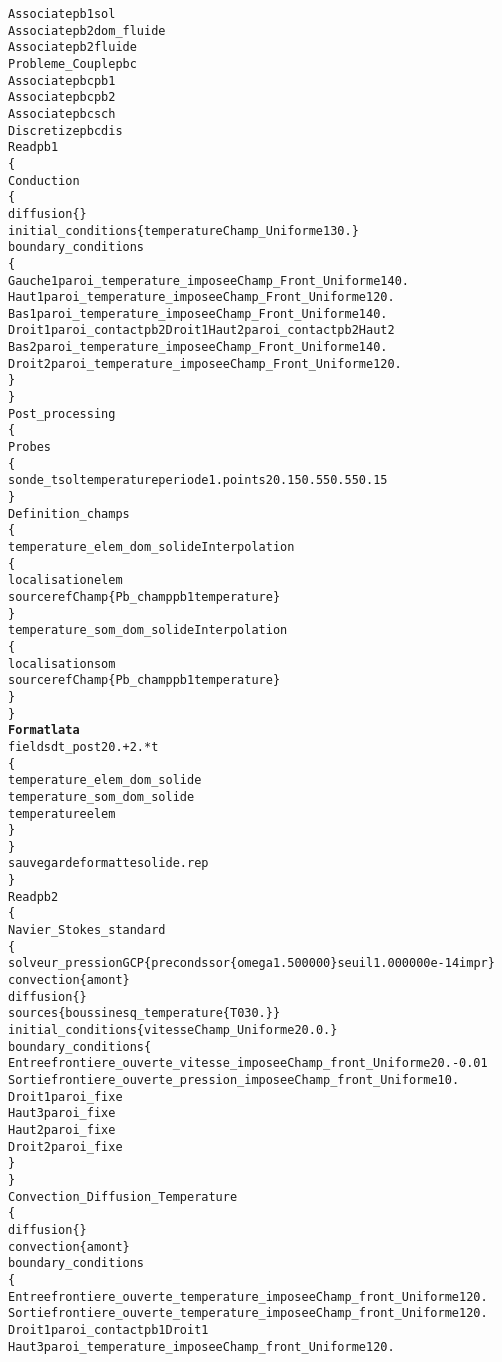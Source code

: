 \begin{alltt}
Associate pb1 sol
Associate pb2 dom_fluide
Associate pb2 fluide
Probleme_Couple pbc
Associate pbc pb1
Associate pbc pb2
Associate pbc sch
Discretize pbc dis
Read pb1
\{
    Conduction
    \{
        diffusion \{ \}
        initial_conditions \{ temperature Champ_Uniforme 1 30. \}
        boundary_conditions
        \{
            Gauche1 paroi_temperature_imposee   Champ_Front_Uniforme 1 40.
            Haut1   paroi_temperature_imposee   Champ_Front_Uniforme 1 20.
            Bas1    paroi_temperature_imposee   Champ_Front_Uniforme 1 40.
            Droit1  paroi_contact pb2  Droit1   Haut2   paroi_contact pb2  Haut2
            Bas2    paroi_temperature_imposee   Champ_Front_Uniforme 1 40.
            Droit2  paroi_temperature_imposee   Champ_Front_Uniforme 1 20.
        \}
    \}
    Post_processing
    \{
        Probes
        \{
            sonde_tsol temperature periode 1. points 2     0.15 0.55     0.55 0.15 
        \}
        Definition_champs 
        \{
            temperature_elem_dom_solide Interpolation
            \{
                localisation elem
                source refChamp \{ Pb_champ pb1 temperature \}
            \}
            temperature_som_dom_solide Interpolation 
            \{
                localisation som
                source refChamp \{ Pb_champ pb1 temperature \}
            \}
        \}
        {\bf{Format lata}}
        fields dt_post 20.+2.*t
        \{
            temperature_elem_dom_solide
            temperature_som_dom_solide
            temperature elem
        \}
    \}
    sauvegarde formatte solide.rep
\}
Read pb2
\{
    Navier_Stokes_standard
    \{
        solveur_pression GCP \{ precond ssor \{ omega 1.500000 \} seuil 1.000000e-14 impr \}
        convection \{ amont \}
        diffusion \{ \}
        sources \{ boussinesq_temperature \{ T0 30. \} \}
        initial_conditions \{ vitesse Champ_Uniforme 2 0. 0. \}
        boundary_conditions \{
            Entree frontiere_ouverte_vitesse_imposee    Champ_front_Uniforme 2 0. -0.01
            Sortie frontiere_ouverte_pression_imposee   Champ_front_Uniforme 1 0.
            Droit1 paroi_fixe
            Haut3  paroi_fixe
            Haut2  paroi_fixe
            Droit2 paroi_fixe
        \}
    \}
    Convection_Diffusion_Temperature
    \{
        diffusion \{ \}
        convection \{ amont \}
        boundary_conditions 
        \{
            Entree frontiere_ouverte_temperature_imposee    Champ_front_Uniforme 1 20.
            Sortie frontiere_ouverte_temperature_imposee    Champ_front_Uniforme 1 20.
            Droit1 paroi_contact pb1  Droit1
            Haut3  paroi_temperature_imposee    Champ_front_Uniforme 1 20.

\end{alltt}
